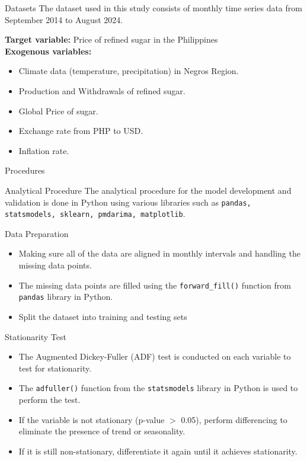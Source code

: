 \documentclass[12pt, aspectratio=169]{beamer}
\begin{document}
\begin{frame}{Datasets}
The dataset used in this study consists of monthly time series data from September 2014 to August 2024. 

\vspace{12pt} 

\textbf{Target variable:} Price of refined sugar in the Philippines\\

\textbf{Exogenous variables:}
\begin{itemize}
    \item Climate data (temperature, precipitation) in Negros Region. 
    \item Production and Withdrawals of refined sugar. 
    \item Global Price of sugar. 
    \item Exchange rate from PHP to USD. 
    \item Inflation rate. 
\end{itemize} 
\end{frame}

\begin{frame}{Procedures}
    \begin{block}{Analytical Procedure}
        The analytical procedure for the model development and validation is done in Python using various libraries such as \texttt{pandas, statsmodels, sklearn, pmdarima, matplotlib}.
    \end{block}
\end{frame}

\begin{frame}{Data Preparation}
    \begin{itemize}
        \item Making sure all of the data are aligned in monthly intervals and handling the missing data points. 
        \item The missing data points are filled using the \texttt{forward\_fill()} function from \texttt{pandas} library in Python.
        \item Split the dataset into training and testing sets
    \end{itemize}
\end{frame}

\begin{frame}{Stationarity Test}
    \begin{itemize}
        \item The Augmented Dickey-Fuller (ADF) test is conducted on each variable to test for stationarity. 
        \item The \texttt{adfuller()} function from the \texttt{statsmodels} library in Python is used to perform the test.
        \item If the variable is not stationary (p-value $>$ 0.05), perform differencing to eliminate the presence of trend or seasonality.
        \item If it is still non-stationary, differentiate it again until it achieves stationarity.
    \end{itemize}
\end{frame}
\end{document}
